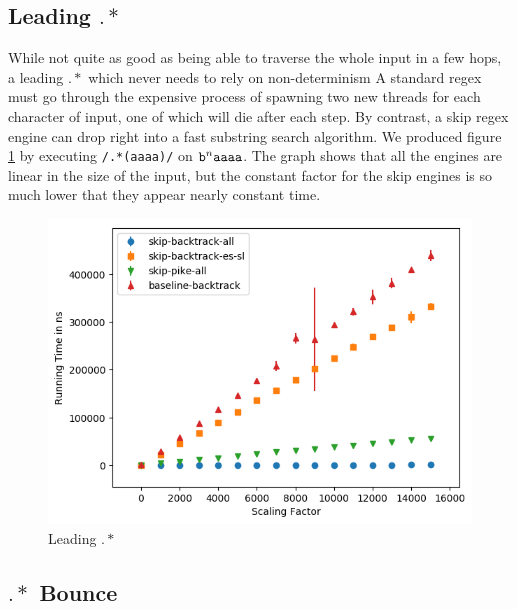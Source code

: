 \subsection{Leading $.*$}

While not quite as good as being able to traverse the whole input
in a few hops, a leading $.*$ which never needs to rely on non-determinism
A standard regex must go through the expensive process of spawning
two new threads for each character of input, one of which will die after
each step. By contrast, a skip regex engine can drop right into a fast substring
search algorithm. We produced figure \ref{fig:leading:dotstar} by executing
\verb'/.*(aaaa)/' on ${\tt b}^n{\tt aaaa}$.
The graph shows that all the engines are linear
in the size of the input, but the constant factor for the skip engines
is so much lower that they appear nearly constant time.

\begin{figure}
\caption{Leading $.*$}
\label{fig:leading:dotstar}

\includegraphics{resources/leading-dotstar.png}
\end{figure}

\subsection{$.*$ Bounce}

